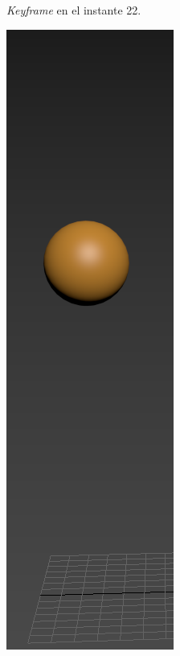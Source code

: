 \documentclass{article}
\begin{document}
\begin{figure}[H]
\begin{subfigure}[H]{0.15\textwidth}
	    \caption{\textit{Keyframe} en el instante 22.}
	\end{subfigure}
    \hfill
	\begin{subfigure}[H]{0.15\textwidth}
	    \centering
	    \includegraphics[width=\textwidth]{imagenes/Ejercicio 2/p1_28.png}

\end{subfigure}
\end{figure}
\end{document}
